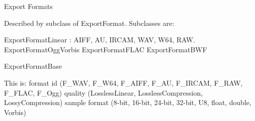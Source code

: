 \documentclass[10pt,a4paper]{book}
\begin{document}
Export Formats

Described by subclass of ExportFormat.  Subclasses are:

ExportFormatLinear : AIFF, AU, IRCAM, WAV, W64, RAW.
ExportFormatOggVorbis
ExportFormatFLAC
ExportFormatBWF

ExportFormatBase 

This is:
 format id (F\_WAV, F\_W64, F\_AIFF, F\_AU, F\_IRCAM, F\_RAW, F\_FLAC, F\_Ogg)
 quality (LosslessLinear, LosslessCompression, LossyCompression)
 sample format (8-bit, 16-bit, 24-bit, 32-bit, U8, float, double, Vorbis)
\end{document}
